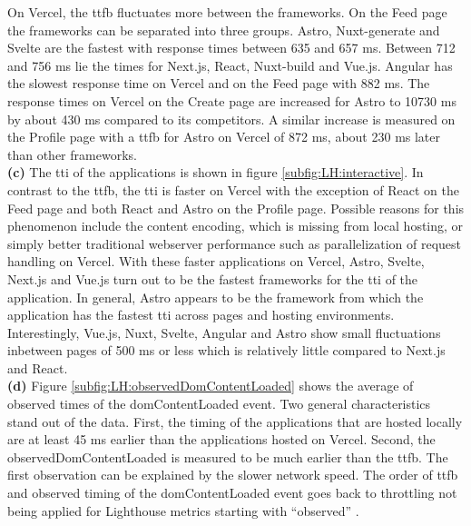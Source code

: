 \documentclass[a4paper, 12pt]{article}
\begin{document}
On Vercel, the \acrshort{ttfb} fluctuates more between the frameworks.
On the Feed page the frameworks can be separated into three groups.
Astro, Nuxt-generate and Svelte are the fastest with response times between 635 and 657 ms.
Between 712 and 756 ms lie the times for Next.js, React, Nuxt-build and Vue.js.
Angular has the slowest response time on Vercel and on the Feed page with 882 ms.
The response times on Vercel on the Create page are increased for Astro to 10730 ms by about 430 ms compared to its competitors.
A similar increase is measured on the Profile page with a \acrshort{ttfb} for Astro on Vercel of 872 ms, about 230 ms later than other frameworks.
\\

\textbf{(c)} The \acrlong{tti} of the applications is shown in figure \ref{subfig:LH:interactive}. In contrast to the \acrshort{ttfb}, the \acrshort{tti} is faster on Vercel with the exception of React on the Feed page and both React and Astro on the Profile page.
Possible reasons for this phenomenon include the content encoding, which is missing from local hosting, or simply better traditional webserver performance such as parallelization of request handling on Vercel.
With these faster applications on Vercel, Astro, Svelte, Next.js and Vue.js turn out to be the fastest frameworks for the \acrlong{tti} of the application.
In general, Astro appears to be the framework from which the application has the fastest \acrshort{tti} across pages and hosting environments.
Interestingly, Vue.js, Nuxt, Svelte, Angular and Astro show small fluctuations inbetween pages of 500 ms or less which is relatively little compared to Next.js and React.
\\

\textbf{(d)} Figure \ref{subfig:LH:observedDomContentLoaded} shows the average of observed times of the domContentLoaded event.
Two general characteristics stand out of the data.
First, the timing of the applications that are hosted locally are at least 45 ms earlier than the applications hosted on Vercel.
Second, the observedDomContentLoaded is measured to be much earlier than the \acrshort{ttfb}.
The first observation can be explained by the slower network speed.
The order of \acrshort{ttfb} and observed timing of the domContentLoaded event goes back to throttling not being applied for Lighthouse metrics starting with \enquote{observed} \citep{observedMetrics}.
\end{document}

